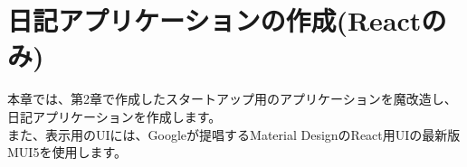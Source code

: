 \chapter{日記アプリケーションの作成(Reactのみ)}
\label{chap:03-todo-with-react}
\begin{reviewimage}[H]%
%
\label{image:03-todo-with-react:diary01}
\end{reviewimage}
\begin{starterabstract}
  本章では、第2章で作成したスタートアップ用のアプリケーションを魔改造し、日記アプリケーションを作成します。\\[0pt]

  また、表示用のUIには、Googleが提唱するMaterial DesignのReact用UIの最新版MUI5を使用します。
\end{starterabstract}

